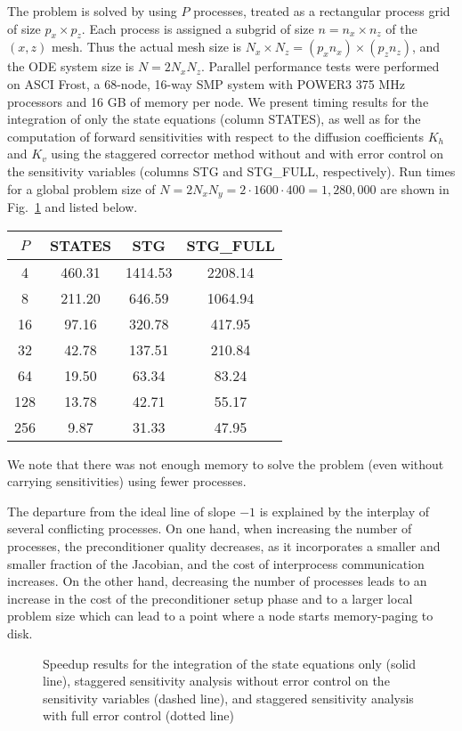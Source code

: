 The problem is solved by {\cvodes} using $P$ processes, treated as a 
rectangular process grid of size $p_x \times p_z$.
Each process is assigned a subgrid of size $n = n_x \times n_z$ of the 
$(x,z)$ mesh.  Thus the actual mesh size is 
$N_x \times N_z = (p_x n_x) \times (p_z n_z)$,
and the ODE system size is $N = 2 N_x N_z$.
Parallel performance tests were performed on ASCI Frost, a 68-node, 16-way SMP system
with POWER3 375 MHz processors and 16 GB of memory per node.
We present timing results for the integration of only the state equations
(column STATES), as well as for
the computation of forward sensitivities with respect to the diffusion coefficients
$K_h$ and $K_v$ using the staggered corrector method without and with 
error control on the sensitivity variables (columns STG and
STG\_FULL, respectively). 
Run times for a global problem size of
$N = 2 N_x N_y = 2 \cdot 1600 \cdot 400 = 1,280,000$ 
are shown in Fig.~\ref{f:pvfktTest} and listed below.

\begin{center}
  \begin{tabular}{cccc}\hline
    $P$ &  STATES  &   STG   & STG\_FULL \\ \hline
    4  &  460.31  &  1414.53  & 2208.14  \\
    8  &  211.20  &   646.59  & 1064.94  \\
    16  &   97.16  &   320.78  &  417.95  \\
    32  &   42.78  &   137.51  &  210.84  \\
    64  &   19.50  &    63.34  &   83.24  \\
    128  &   13.78  &    42.71  &   55.17  \\
    256  &    9.87  &    31.33  &   47.95  \\ \hline
  \end{tabular}
\end{center}

We note that there was not enough memory to solve the problem (even without
carrying sensitivities) using fewer processes.

The departure from the ideal line of slope $-1$ is explained by the 
interplay of several conflicting processes. On one hand, when increasing the 
number of processes, the preconditioner quality decreases, as it incorporates 
a smaller and smaller fraction of the Jacobian, and the cost of interprocess 
communication increases. On the other hand, decreasing the number of processes
leads to an increase in the cost of the preconditioner setup phase and to a larger
local problem size which can lead to a point where a node starts memory-paging
to disk.
\begin{figure}
  {\centerline{}}
  \caption[Speedup results on a sensitivity problem]
  {Speedup results for the integration of the state equations only
    (solid line), staggered sensitivity analysis without
    error control on the sensitivity variables (dashed line),
    and staggered sensitivity analysis with full error control (dotted line)}
  \label{f:pvfktTest}
\end{figure}

